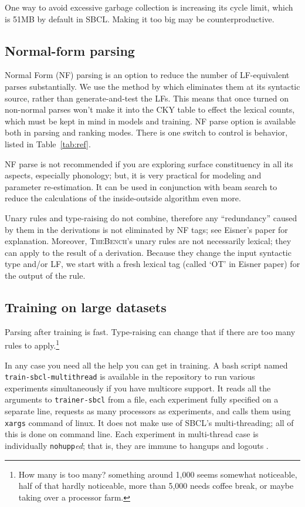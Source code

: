 \documentclass[11pt]{article}
\newcommand{\tool}{\textsc{TheBench}}
\begin{document}
{{One way to avoid excessive garbage collection is increasing its cycle limit, which is 51MB by default in SBCL. Making it too big
may be counterproductive.}

\subsection{{Normal-form parsing}}
{Normal Form (NF) parsing is an option to reduce
the number of LF-equivalent parses substantially. We use the method by
\cite{eisner96} which eliminates them at its syntactic source, rather than generate-and-test the LFs. This means that once turned on non-normal parses won't make it into the CKY table
to effect the lexical counts, which must be kept in mind in models and training.
NF parse option is available both in parsing and ranking modes.
There is one switch to control is behavior, listed  in Table~\ref{tab:ref}.}

{NF parse is not recommended if you are exploring surface constituency in all its aspects, especially phonology; but, it is very practical for modeling
and parameter re-estimation. It can be used
in conjunction with beam search to reduce the calculations of the inside-outside
algorithm even more.}

{Unary rules and type-raising do not combine, therefore
any ``redundancy'' caused by them in the derivations is not eliminated by NF tags; see
Eisner's paper for explanation. Moreover, \tool's unary rules are not necessarily lexical; they can apply to the result of a derivation. Because they change the input syntactic type and/or LF, we start with a fresh lexical tag (called `OT' in Eisner paper) for the output
of the rule.}

\subsection{Training on large datasets}
Parsing after training is  fast. Type-raising can change that if there are too many rules to apply.\footnote{How many is too many? something around 1,000 seems somewhat noticeable, half of  that hardly noticeable, more than 5,000 needs coffee break, or maybe taking over a processor farm.}

{In any case you need
all the help you can get in training. 
{A bash script named} \verb|train-sbcl-multithread| {is available in the repository to run various experiments simultaneously if you have multicore support. It reads all the arguments to}
\verb|trainer-sbcl| {from a file, each experiment fully
specified on a separate line, requests as many processors as experiments, and calls them using}  \verb|xargs| {command of linux. It does not make use of SBCL's multi-threading; all of this is done on command line. Each experiment
in multi-thread case is individually} \verb|nohupp|\emph{ed}; that is, they are immune to hangups and logouts .

}}
\end{document}

